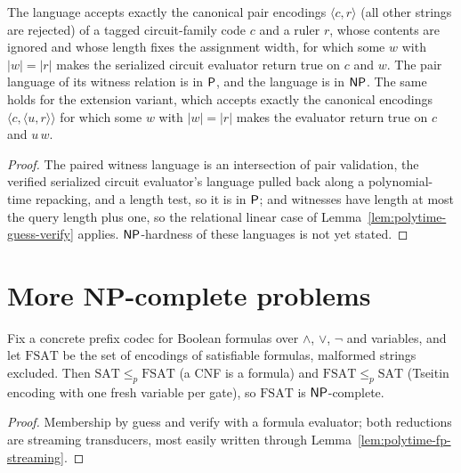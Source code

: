 \begin{theorem}
  \label{thm:polytime-circuit-sat-np}
  \leanok
  The language accepts exactly the canonical pair encodings
  $\langle c, r \rangle$ (all other strings are rejected) of a tagged
  circuit-family code $c$ and a ruler $r$, whose contents are ignored and whose
  length fixes the assignment width, for which some $w$ with $|w| = |r|$ makes
  the serialized circuit evaluator return true on $c$ and $w$. The pair
  language of its witness relation is in $\mathsf{P}$, and the language is in
  $\mathsf{NP}$. The same holds for the extension variant, which accepts exactly
  the canonical encodings $\langle c, \langle u, r \rangle \rangle$ for which
  some $w$ with $|w| = |r|$ makes the evaluator return true on $c$ and $u\,w$.
\end{theorem}
\begin{proof}
  \leanok
  The paired witness language is an intersection of pair validation, the
  verified serialized circuit evaluator's language pulled back along a
  polynomial-time repacking, and a length test, so it is in $\mathsf{P}$; and
  witnesses have length at most the query length plus one, so the relational
  linear case of Lemma~\ref{lem:polytime-guess-verify} applies.
  $\mathsf{NP}$-hardness of these languages is not yet stated.
\end{proof}

\section{More NP-complete problems}

\begin{theorem}
  \label{thm:polytime-formula-sat}
  Fix a concrete prefix codec for Boolean formulas over $\wedge$, $\vee$,
  $\neg$ and variables, and let $\mathrm{FSAT}$ be the set of encodings of
  satisfiable formulas, malformed strings excluded. Then
  $\mathrm{SAT} \le_p \mathrm{FSAT}$ (a CNF is a formula) and
  $\mathrm{FSAT} \le_p \mathrm{SAT}$ (Tseitin encoding with one fresh variable
  per gate), so $\mathrm{FSAT}$ is $\mathsf{NP}$-complete.
\end{theorem}
\begin{proof}
  Membership by guess and verify with a formula evaluator; both reductions are
  streaming transducers, most easily written through
  Lemma~\ref{lem:polytime-fp-streaming}.
\end{proof}

